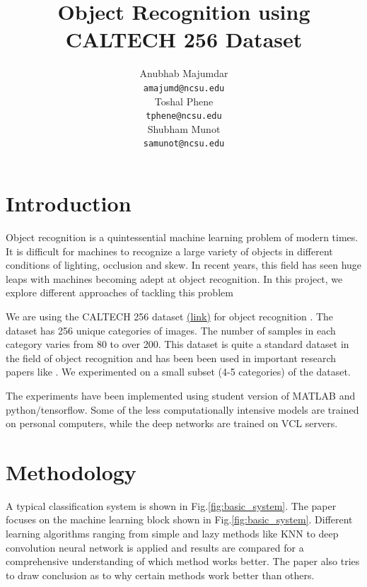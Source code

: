 \documentclass{article} %
\title{Object Recognition using CALTECH 256 Dataset}
\author{
Anubhab Majumdar \\
\texttt{amajumd@ncsu.edu} \\
\And
Toshal Phene \\
\texttt{tphene@ncsu.edu} \\
\AND
Shubham Munot \\
\texttt{samunot@ncsu.edu} \\
}
\begin{document}
\maketitle


\section{Introduction}
Object recognition is a quintessential machine learning problem of modern times. It is difficult for machines to recognize a large variety of objects in different conditions of lighting, occlusion and skew. In recent years, this field has seen huge leaps with machines becoming adept at object recognition. In this project, we explore different approaches of tackling this problem

\par We are using the CALTECH 256 dataset \href{http://www.vision.caltech.edu/Image_Datasets/Caltech256/}{(link)} for object recognition \cite{caltech_dataset_paper}. The dataset has 256 unique categories of images. The number of samples in each category varies from 80 to over 200. This dataset is quite a standard dataset in the field of object recognition and has been been used in important research papers like \cite{knn_svm_paper}. We experimented on a small subset (4-5 categories) of the dataset. 

\par The experiments have been implemented using student version of MATLAB and python/tensorflow. Some of the less computationally intensive models are trained on personal computers, while the deep networks are trained on VCL servers.


\section{Methodology}

A typical classification system is shown in Fig.\ref{fig:basic_system}. The paper focuses on the machine learning block shown in Fig.\ref{fig:basic_system}. Different learning algorithms ranging from simple and lazy methods like KNN to deep convolution neural network is applied and results are compared for a comprehensive understanding of which method works better. The paper also tries to draw conclusion as to why certain methods work better than others. 
\end{document}

